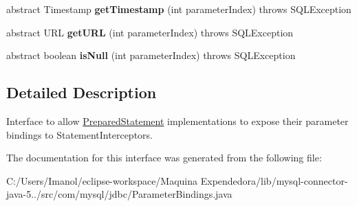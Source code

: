 \begin{DoxyCompactItemize}
abstract Timestamp {\bfseries get\+Timestamp} (int parameter\+Index)  throws S\+Q\+L\+Exception
\item 
\mbox{\label{interfacecom_1_1mysql_1_1jdbc_1_1_parameter_bindings_ada309f9edfa173c5fbf7056c78b628d8}} 
abstract U\+RL {\bfseries get\+U\+RL} (int parameter\+Index)  throws S\+Q\+L\+Exception
\item 
\mbox{\label{interfacecom_1_1mysql_1_1jdbc_1_1_parameter_bindings_a8ab327b1176671af0e85b3b4515104b6}} 
abstract boolean {\bfseries is\+Null} (int parameter\+Index)  throws S\+Q\+L\+Exception
\end{DoxyCompactItemize}


\subsection{Detailed Description}
Interface to allow \mbox{\hyperlink{classcom_1_1mysql_1_1jdbc_1_1_prepared_statement}{Prepared\+Statement}} implementations to expose their parameter bindings to Statement\+Interceptors. 

The documentation for this interface was generated from the following file\+:\begin{DoxyCompactItemize}
\item 
C\+:/\+Users/\+Imanol/eclipse-\/workspace/\+Maquina Expendedora/lib/mysql-\/connector-\/java-\/5../src/com/mysql/jdbc/Parameter\+Bindings.\+java\end{DoxyCompactItemize}
